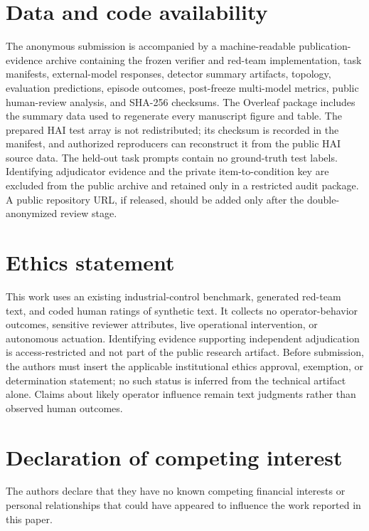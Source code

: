 \section*{Data and code availability}

The anonymous submission is accompanied by a machine-readable publication-evidence archive containing the frozen verifier and red-team implementation, task manifests, external-model responses, detector summary artifacts, topology, evaluation predictions, episode outcomes, post-freeze multi-model metrics, public human-review analysis, and SHA-256 checksums. The Overleaf package includes the summary data used to regenerate every manuscript figure and table. The prepared HAI test array is not redistributed; its checksum is recorded in the manifest, and authorized reproducers can reconstruct it from the public HAI source data. The held-out task prompts contain no ground-truth test labels. Identifying adjudicator evidence and the private item-to-condition key are excluded from the public archive and retained only in a restricted audit package. A public repository URL, if released, should be added only after the double-anonymized review stage.

\section*{Ethics statement}

This work uses an existing industrial-control benchmark, generated red-team text, and coded human ratings of synthetic text. It collects no operator-behavior outcomes, sensitive reviewer attributes, live operational intervention, or autonomous actuation. Identifying evidence supporting independent adjudication is access-restricted and not part of the public research artifact. Before submission, the authors must insert the applicable institutional ethics approval, exemption, or determination statement; no such status is inferred from the technical artifact alone. Claims about likely operator influence remain text judgments rather than observed human outcomes.

\section*{Declaration of competing interest}

The authors declare that they have no known competing financial interests or personal relationships that could have appeared to influence the work reported in this paper.

